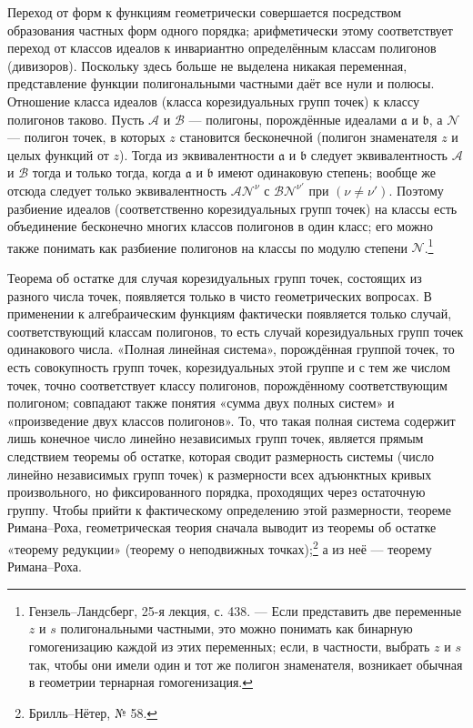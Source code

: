 \documentclass[11pt]{article}
\providecommand{\fra}{\mathfrak a}
\providecommand{\frb}{\mathfrak b}
\providecommand{\calA}{\mathcal A}
\providecommand{\calB}{\mathcal B}
\providecommand{\calN}{\mathcal N}
\begin{document}
Переход от форм к функциям геометрически совершается посредством образования частных форм одного порядка; арифметически этому соответствует переход от классов идеалов к инвариантно определённым классам полигонов (дивизоров). Поскольку здесь больше не выделена никакая переменная, представление функции полигональными частными даёт все нули и полюсы. Отношение класса идеалов (класса корезидуальных групп точек) к классу полигонов таково. Пусть \(\calA\) и \(\calB\) --- полигоны, порождённые идеалами \(\fra\) и \(\frb\), а \(\calN\) --- полигон точек, в которых \(z\) становится бесконечной (полигон знаменателя \(z\) и целых функций от \(z\)). Тогда из эквивалентности \(\fra\) и \(\frb\) следует эквивалентность \(\calA\) и \(\calB\) тогда и только тогда, когда \(\fra\) и \(\frb\) имеют одинаковую степень; вообще же отсюда следует только эквивалентность \(\calA\calN^\nu\) с \(\calB\calN^{\nu'}\) при \((\nu\ne\nu')\). Поэтому разбиение идеалов (соответственно корезидуальных групп точек) на классы есть объединение бесконечно многих классов полигонов в один класс; его можно также понимать как разбиение полигонов на классы по модулю степени \(\calN\).\footnote{Гензель--Ландсберг, 25-я лекция, с. 438. --- Если представить две переменные \(z\) и \(s\) полигональными частными, это можно понимать как бинарную гомогенизацию каждой из этих переменных; если, в частности, выбрать \(z\) и \(s\) так, чтобы они имели один и тот же полигон знаменателя, возникает обычная в геометрии тернарная гомогенизация.}

Теорема об остатке для случая корезидуальных групп точек, состоящих из разного числа точек, появляется только в чисто геометрических вопросах. В применении к алгебраическим функциям фактически появляется только случай, соответствующий классам полигонов, то есть случай корезидуальных групп точек одинакового числа. «Полная линейная система», порождённая группой точек, то есть совокупность групп точек, корезидуальных этой группе и с тем же числом точек, точно соответствует классу полигонов, порождённому соответствующим полигоном; совпадают также понятия «сумма двух полных систем» и «произведение двух классов полигонов». То, что такая полная система содержит лишь конечное число линейно независимых групп точек, является прямым следствием теоремы об остатке, которая сводит размерность системы (число линейно независимых групп точек) к размерности всех адъюнктных кривых произвольного, но фиксированного порядка, проходящих через остаточную группу. Чтобы прийти к фактическому определению этой размерности, теореме Римана--Роха, геометрическая теория сначала выводит из теоремы об остатке «теорему редукции» (теорему о неподвижных точках);\footnote{Брилль--Нётер, № 58.} а из неё --- теорему Римана--Роха.
\end{document}
